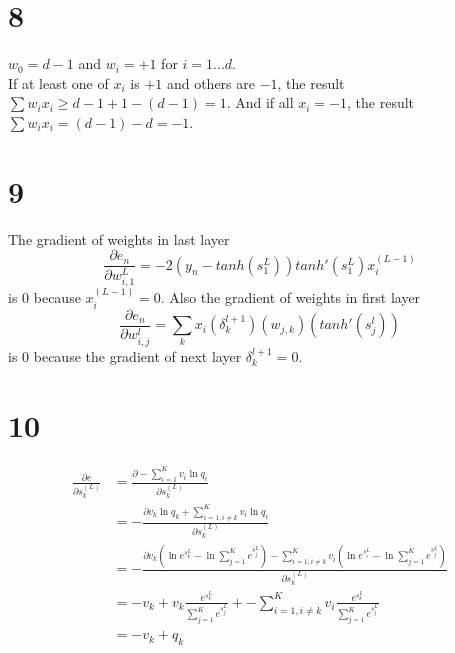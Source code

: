 \documentclass[12pt]{article}
\begin{document}
\section*{8}
$w_0 = d-1$ and $w_i = +1$ for $i=1...d$. \\
If at least one of $x_i$ is $+1$ and others are $-1$, the result $\sum w_i x_i \geq d-1 + 1 - (d-1) = 1$.
And if all $x_i = -1$, the result $\sum w_i x_i = (d-1) - d = -1$.

\section*{9}
The gradient of weights in last layer 
\[
    \frac{\partial e_n}{\partial w_{i,1}^L}
    = -2 (y_n - tanh(s_1^L)) tanh'(s_1^L) x_i^{(L-1)}
\]
is $0$ because $x_i^{(L-1)}=0$.
Also the gradient of weights in first layer
\[
    \frac{\partial e_n}{\partial w_{i,j}^l}
    = \sum_k x_i (\delta_k^{l+1}) (w_{j,k}) (tanh'(s_j^l))
\]
is $0$ because the gradient of next layer $\delta_k^{l+1}=0$.

\section*{10}
\begin{equation*}
\begin{split}
\frac{\partial e}{\partial s_k^{(L)}} &= \frac{\partial -\sum_{i=1}^{K} v_i \ln q_i}{\partial s_k^{(L)}} \\
&= - \frac{\partial v_k \ln q_k + \sum_{i=1, i\neq k}^{K} v_i \ln q_i}{\partial s_k^{(L)}} \\
&= - \frac{\partial v_k(\ln e^{s_k^L} - \ln\sum_{j=1}^K e^{s_j^L}) - \sum_{i=1, i\neq k}^{K} v_i(\ln e^{s_i^L} - \ln\sum_{j=1}^K e^{s_j^L})}{\partial s_k^{(L)}} \\
&= - v_k + v_k \frac{e^{s_k^L}}{\sum_{j=1}^K e^{s_j^L}} + - \sum_{i=1, i\neq k}^{K} v_i \frac{e^{s_k^L}}{\sum_{j=1}^K e^{s_j^L}} \\
&= -v_k + q_k
\end{split}
\end{equation*}
\end{document}
